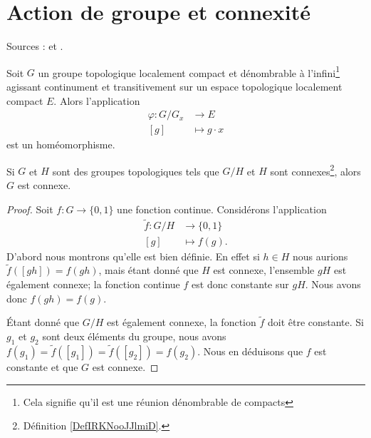 
\section{Action de groupe et connexité}

Sources : \cite{MneimneLie} et .

\begin{theorem}     \label{ThojrLKZk}
    Soit \( G\) un groupe topologique localement compact et dénombrable à l'infini\footnote{Cela signifie qu'il est une réunion dénombrable de compacts} agissant continument et transitivement sur un espace topologique localement compact \( E\). Alors l'application
    \begin{equation}
        \begin{aligned}
            \varphi\colon G/G_x&\to E \\
            [g]&\mapsto g\cdot x 
        \end{aligned}
    \end{equation}
    est un homéomorphisme.
\end{theorem}

\begin{lemma}       \label{LemkLRAet}
    Si \( G\) et \( H\) sont des groupes topologiques tels que $G/H$ et \( H\) sont connexes\footnote{Définition \ref{DefIRKNooJJlmiD}.}, alors \( G\) est connexe.
\end{lemma}

\begin{proof}
    Soit \( f\colon G\to \{ 0,1 \}\) une fonction continue. Considérons l'application
    \begin{equation}
        \begin{aligned}
            \tilde f\colon G/H&\to \{ 0,1 \} \\
            [g]&\mapsto f(g). 
        \end{aligned}
    \end{equation}
    D'abord nous montrons qu'elle est bien définie. En effet si \( h\in H\) nous aurions \( \tilde f([gh])=f(gh)\), mais étant donné que \( H\) est connexe, l'ensemble \( gH\) est également connexe; la fonction continue \( f\) est donc constante sur \( gH\). Nous avons donc \( f(gh)=f(g)\).

    Étant donné que \( G/H\) est également connexe, la fonction \( \tilde f\) doit être constante. Si \( g_1\) et \( g_2\) sont deux éléments du groupe, nous avons \( f(g_1)=\tilde f([g_1])=\tilde f([g_2])=f(g_2)\). Nous en déduisons que \( f\) est constante et que \( G\) est connexe.
\end{proof}

